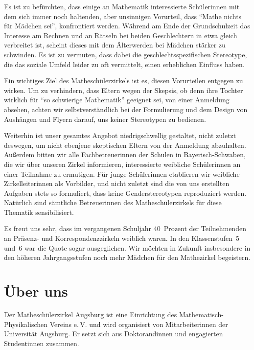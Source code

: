 \documentclass[12pt]{zettel}
\newcommand{\twopics}[2]{%
  \begin{figure}[b]%
    \vspace*{0.5cm}%
    \makebox[\textwidth][c]{%
      \texttt{[image: impressionen/\#1]}%
      \hspace*{1cm}%
      \texttt{[image: impressionen/\#2]}%
    }%
    \vspace*{-1cm}%
  \end{figure}
}
\begin{document}
\newpage

Es ist zu befürchten, dass einige an Mathematik interessierte Schülerinnen mit dem sich immer noch haltenden, aber unsinnigen Vorurteil, dass "`Mathe nichts für Mädchen sei"',
konfrontiert werden. Während am Ende der Grundschulzeit das Interesse am Rechnen und an Rätseln bei beiden Geschlechtern in etwa gleich verbreitet ist, scheint dieses mit
dem Älterwerden bei Mädchen stärker zu schwinden. Es ist zu vermuten, dass dabei die geschlechtsspezifischen Stereotype, die das soziale Umfeld leider zu oft vermittelt, einen
erheblichen Einfluss haben.

Ein wichtiges Ziel des Matheschülerzirkels ist es, diesen Vorurteilen entgegen zu wirken. Um zu verhindern, dass Eltern wegen der Skepsis, ob denn ihre
Tochter wirklich für "`so schwierige Mathematik"' geeignet sei, von einer Anmeldung absehen, achten wir selbstverständlich bei der Formulierung und dem Design von Aushängen und Flyern
darauf, uns keiner Stereotypen zu bedienen.

Weiterhin ist unser gesamtes Angebot niedrigschwellig gestaltet, nicht zuletzt deswegen, um nicht ebenjene skeptischen Eltern
von der Anmeldung abzuhalten. Außerdem bitten wir alle Fachbetreuerinnen der Schulen in Bayerisch-Schwaben, die wir über unseren Zirkel informieren, interessierte weibliche Schülerinnen an
einer Teilnahme zu ermutigen. Für junge Schülerinnen etablieren wir weibliche Zirkelleiterinnen als Vorbilder, und nicht zuletzt sind die von uns erstellten Aufgaben stets so formuliert, dass keine Genderstereotypen reproduziert werden. Natürlich sind sämtliche Betreuerinnen des
Matheschülerzirkels für diese Thematik sensibilisiert.

Es freut uns sehr, dass im vergangenen Schuljahr
40~Prozent der Teilnehmenden an Präsenz- und Korrespondenzzirkeln weiblich waren. In den Klassenstufen~5 und~6 war die Quote sogar ausgeglichen. Wir möchten in Zukunft insbesondere
in den höheren Jahrgangsstufen noch mehr Mädchen für den Mathezirkel begeistern.

\twopics{klein-04}{klein-08}


\section{Über uns}

Der Matheschülerzirkel Augsburg ist eine Einrichtung des
Mathematisch-Phy\-si\-ka\-li\-schen Vereins e.\,V. und wird organisiert von
Mitarbeiterinnen der Universität
Augsburg. Er setzt sich aus Doktorandinnen
und engagierten Studentinnen zusammen.
\end{document}
